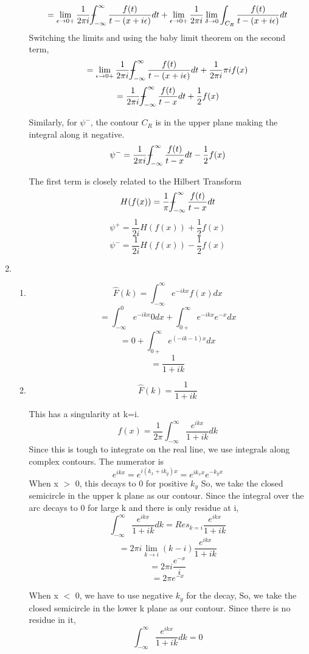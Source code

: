 \documentclass[a4paper]{article}
\def\Xint#1{\mathchoice
	{\XXint\displaystyle\textstyle{#1}}%
	{\XXint\textstyle\scriptstyle{#1}}%
	{\XXint\scriptstyle\scriptscriptstyle{#1}}%
	{\XXint\scriptscriptstyle\scriptscriptstyle{#1}}%
	\!\int}
\def\XXint#1#2#3{{\setbox0=\hbox{$#1{#2#3}{\int}$}
		\vcenter{\hbox{$#2#3$}}\kern-.5\wd0}}
\def\dashint{\Xint-}
\begin{document}
\begin{enumerate}
\begin{enumerate}
		\[=	\lim_{\epsilon \to 0+} \frac{1}{2\pi i} \dashint_{-\infty}^{\infty} \frac{f(t)}{t - (x+i\epsilon)}dt  +  \lim_{\epsilon \to 0+} \frac{1}{2\pi i}\lim_{\delta\to 0} \int_{C_R} \frac{f(t)}{t - (x+i\epsilon)}dt\]	
Switching the limits and using the baby limit theorem on the second term,				
\[=	\lim_{\epsilon \to 0+} \frac{1}{2\pi i} \dashint_{-\infty}^{\infty} \frac{f(t)}{t - (x+i\epsilon)}dt  + \frac{1}{2\pi i}\pi i f(x) \]
\[=	 \frac{1}{2\pi i} \dashint_{-\infty}^{\infty} \frac{f(t)}{t - x}dt  + \frac{1}{2} f(x) \]	

Similarly, for $\psi^{-}$, the contour $C_R$  is in the upper plane making the integral along it negative.
\[\psi^{-}=	 \frac{1}{2\pi i} \dashint_{-\infty}^{\infty} \frac{f(t)}{t - x}dt - \frac{1}{2} f(x) \]	

The first term is closely related to the Hilbert Transform
\[H(f(x)) = \frac{1}{\pi } \dashint_{-\infty}^{\infty} \frac{f(t)}{t - x}dt\] 
\[\psi^{+}=	 \frac{1}{2i}  H(f(x)) + \frac{1}{2} f(x) \]	
\[\psi^{-}=	 \frac{1}{2i}  H(f(x)) - \frac{1}{2} f(x) \]		 
\end{enumerate}
\item		
\begin{enumerate}
	
	\item
	\[\hat{F}(k)=\int_{-\infty}^\infty e^{-ikx}f(x)dx\]
	\[=\int_{-\infty}^0 e^{-ikx}0dx+\int_{0+}^\infty e^{-ikx}e^{-x}dx\]
		\[=0+\int_{0+}^\infty e^{(-ik-1)x}dx\]
	\[=\frac{1}{1+ik}\]
		\item
			\[\hat{F}(k)=\frac{1}{1+ik}\]
			
			This has a singularity at  k=i.
\[	f(x) = \frac{1}{2\pi}\int_{-\infty}^\infty\frac{e^{ikx}}{1+ik}dk \]
Since this is tough to integrate on the real line, we use integrals along complex contours. 
The numerator is
\[ e^{ikx}= e^{i(k_x+ik_y)x} =e^{ik_xx}e^{-k_yx}\]
When x $>$ 0, this decays to 0 for positive $k_y$
So, we take the closed semicircle in the upper k plane as our contour. Since the integral over the arc decays to 0 for large k and there is only residue at i,
\[			 \int_{-\infty}^\infty \frac{e^{ikx}}{1+ik}dk= Res_{k=i}\frac{e^{ikx}}{1+ik} \]
\[			= 2 \pi i \lim_{k \to i} (k-i)\frac{e^{ikx}}{1+ik} \]
\[			= 2 \pi i  \frac{e^{-x}}{i} \]
\[			= 2 \pi e^{-x} \]

When x $<$ 0, we have to use negative $k_y$ for the decay,
So, we take the closed semicircle in the lower k plane as our contour. Since there is no residue in it,
\[			 \int_{-\infty}^\infty \frac{e^{ikx}}{1+ik}dk= 0 \]


\end{enumerate}
\end{enumerate}
\end{document}
